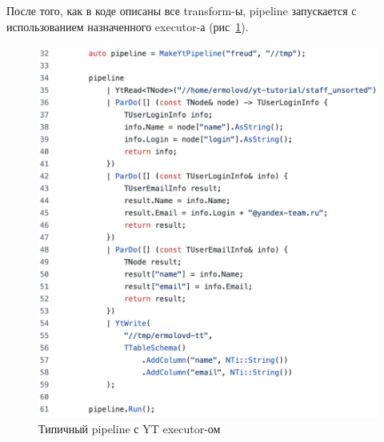 После того, как в коде описаны все transform-ы, pipeline запускается с использованием назначенного executor-а (рис~\ref{fig:pipeline}).

\begin{figure}[h]
    \centering
    \includegraphics[width=\textwidth]{img/pipeline.png}
    \caption{Типичный pipeline с YT executor-ом}
    \label{fig:pipeline}
\end{figure}

